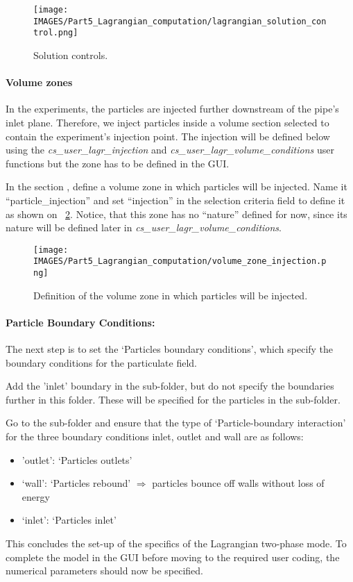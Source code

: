 \begin{figure}[H]
\centering
\texttt{[image: \\IMAGES/Part5\_Lagrangian\_computation/lagrangian\_solution\_control.png]}
\caption{Solution controls.}\label{lag:lagrangian_solution_control}
\end{figure}

\paragraph{Volume zones}

In the experiments, the particles are injected further downstream of the pipe's inlet plane.  Therefore, we inject particles inside a volume section selected to contain the experiment's injection point. The injection will be defined below using the \textit{cs\_user\_lagr\_injection} and \textit{cs\_user\_lagr\_volume\_conditions} user functions but the zone has to be defined in the GUI.

In the section , define a volume zone in which particles will be injected.
Name it ``particle\_injection'' and set ``injection'' in the selection criteria field to define it as shown on \figurename~\ref{lag:volume_zone_injection}.
Notice, that this zone has no ``nature'' defined for now, since its nature will be defined later in \textit{cs\_user\_lagr\_volume\_conditions}.
%
\begin{figure}[H]
\centering
\texttt{[image: \\IMAGES/Part5\_Lagrangian\_computation/volume\_zone\_injection.png]}
\caption{Definition of the volume zone in which particles will be injected.}\label{lag:volume_zone_injection}
\end{figure}
%

\paragraph{Particle Boundary Conditions:}

The next step is to set the ‘Particles boundary conditions’, which specify the boundary conditions for the particulate field.

Add the 'inlet' boundary in the  sub-folder, but do not specify the boundaries further in this folder.  These will be specified for the particles in the  sub-folder.

Go to the  sub-folder and ensure that the type of ‘Particle-boundary interaction’ for the three boundary conditions inlet, outlet and wall are as follows:
%
\begin{itemize}
\item 'outlet': ‘Particles outlets’
\item ‘wall’: ‘Particles rebound’ $\Rightarrow$ particles bounce off walls without loss of energy
\item ‘inlet’: ‘Particles inlet’
\end{itemize}
%
This concludes the set-up of the specifics of the Lagrangian two-phase mode.  To complete the model in the GUI before moving to the required user coding, the numerical parameters should now be specified.


